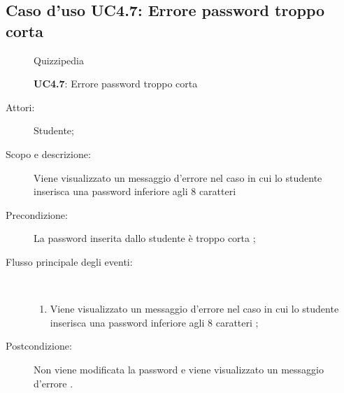 \subsection{Caso d'uso UC4.7: Errore password troppo corta}
	\begin{figure}[H]
		\centering
		\begin{resizedtikzpicture}{\textwidth}
		\begin{umlsystem}[x=0, fill=lightgray!20]{Quizzipedia}
		\end{umlsystem}
		\end{resizedtikzpicture}
		\caption{\textbf{UC4.7}: Errore password troppo corta}
		\label{UC4.7}
	\end{figure}
\begin{description}
\item[Attori:] Studente;
\item[Scopo e descrizione:] Viene visualizzato un messaggio d'errore nel caso in cui lo studente inserisca una password inferiore agli 8 caratteri

      \item[Precondizione:] La password inserita dallo studente è troppo corta
;

        \item[Flusso principale degli eventi:] \ 
 \begin{enumerate}
          \item Viene visualizzato un messaggio d'errore nel caso in cui lo studente inserisca una password inferiore agli 8 caratteri	;

      \end{enumerate}
    \item[Postcondizione:] Non viene modificata la password e viene visualizzato un messaggio d'errore
.
  \end{description}
\hypertarget{UC5}{}
